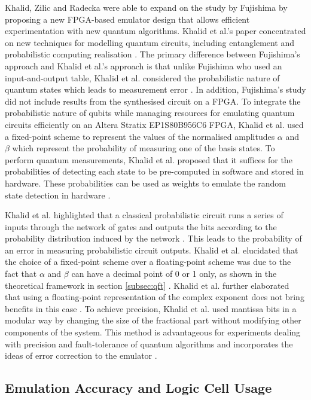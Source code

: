 Khalid, Zilic and Radecka were able to expand on the study by Fujishima by proposing a new FPGA-based emulator design that allows efficient experimentation with new quantum algorithms. Khalid et al.'s paper concentrated on new techniques for modelling quantum circuits, including entanglement and probabilistic computing realisation \cite{Khalid2004}. The primary difference between Fujishima's approach and Khalid et al.'s approach is that unlike Fujishima who used an input-and-output table, Khalid et al. considered the probabilistic nature of quantum states which leads to measurement error \cite{Khalid2004}. In addition, Fujishima's study did not include results from the synthesised circuit on a FPGA. To integrate the probabilistic nature of qubits while managing resources for emulating quantum circuits efficiently on an Altera Stratix EP1S80B956C6 FPGA, Khalid et al. used a fixed-point scheme to represent the values of the normalised amplitudes $\alpha$ and $\beta$ which represent the probability of measuring one of the basis states. To perform quantum measurements, Khalid et al. proposed that it suffices for the probabilities of detecting each state to be pre-computed in software and stored in hardware. These probabilities can be used as weights to emulate the random state detection in hardware \cite{Khalid2004}. 

Khalid et al. highlighted that a classical probabilistic circuit runs a series of inputs through the network of gates and outputs the bits according to the probability distribution induced by the network \cite{Khalid2004}. This leads to the probability of an error in measuring probabilistic circuit outputs.  Khalid et al. elucidated that the choice of a fixed-point scheme over a floating-point scheme was due to the fact that $\alpha$ and $\beta$ can have a decimal point of 0 or 1 only, as shown in the theoretical framework in section \ref{subsec:qft} \cite{Khalid2004}. Khalid et al. further elaborated that using a floating-point representation of the complex exponent does not bring benefits in this case \cite{Khalid2004}. To achieve precision, Khalid et al. used \gls{mantissa} bits in a modular way by changing the size of the fractional part without modifying other components of the system. This method is advantageous for experiments dealing with precision and fault-tolerance of quantum algorithms and incorporates the ideas of error correction to the emulator \cite{Khalid2004}. 

\subsection{Emulation Accuracy and Logic Cell Usage}

